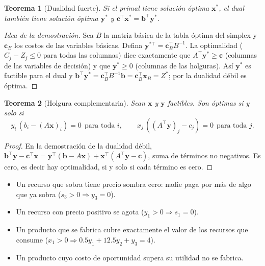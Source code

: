 \documentclass[a4paper,11pt]{article}
\theoremstyle{plain}
\newtheorem{teorema}{Teorema}[section]
\theoremstyle{definition}
\begin{document}
\begin{teorema}[Dualidad fuerte]
Si el primal tiene solución óptima $\mathbf x^*$, el dual también tiene solución óptima $\mathbf y^*$ y
$\mathbf c^\top\mathbf x^*=\mathbf b^\top\mathbf y^*$.
\end{teorema}
\begin{proof}[Idea de la demostración]
Sea $B$ la matriz básica de la tabla óptima del simplex y $\mathbf c_B$ los costos de las variables básicas.
Defina $\mathbf y^{*\top}=\mathbf c_B^\top B^{-1}$. La optimalidad ($C_j-Z_j\le0$ para todas las columnas) dice
exactamente que $A^\top\mathbf y^*\ge\mathbf c$ (columnas de las variables de decisión) y que $\mathbf y^*\ge0$
(columnas de las holguras). Así $\mathbf y^*$ es factible para el dual y
$\mathbf b^\top\mathbf y^*=\mathbf c_B^\top B^{-1}\mathbf b=\mathbf c_B^\top\mathbf x_B=Z^*$; por la dualidad débil es óptima.
\end{proof}

\begin{teorema}[Holgura complementaria]
Sean $\mathbf x$ y $\mathbf y$ factibles. Son óptimas si y solo si
\[
y_i\,(b_i-(A\mathbf x)_i)=0\ \ \text{para toda } i,\qquad x_j\,((A^\top\mathbf y)_j-c_j)=0\ \ \text{para toda } j.
\]
\end{teorema}
\begin{proof}
En la demostración de la dualidad débil,
$\mathbf b^\top\mathbf y-\mathbf c^\top\mathbf x=\mathbf y^\top(\mathbf b-A\mathbf x)+\mathbf x^\top(A^\top\mathbf y-\mathbf c)$, suma de términos no negativos.
Es cero, es decir hay optimalidad, si y solo si cada término es cero.
\end{proof}

\begin{idea}
\begin{itemize}
\item Un recurso que sobra tiene precio sombra cero: nadie paga por más de algo que ya sobra ($s_3>0\Rightarrow y_3=0$).
\item Un recurso con precio positivo se agota ($y_1>0\Rightarrow s_1=0$).
\item Un producto que se fabrica cubre exactamente el valor de los recursos que consume
($x_1>0\Rightarrow0.5y_1+12.5y_2+y_3=4$).
\item Un producto cuyo costo de oportunidad supera su utilidad no se fabrica.
\end{itemize}
\end{idea}

\end{document}
